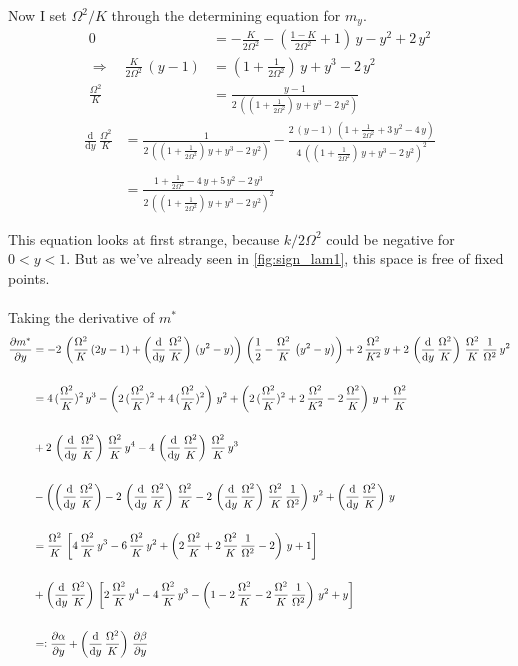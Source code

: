 \documentclass{article}
\begin{document}
\begin{appendices}
Now I set $\Omega^2/K$ through the determining equation for $m_y$.
\begin{align*}
    0&=-\frac{K}{2\Omega^2}-\left( \frac{1-K}{2\Omega^2} +1\right)\,{y}-{y}^2+2\,{y}^2\\
    \Rightarrow\quad \frac{K}{2\Omega^2}\,({y}-1)&=(1+\frac{1}{2\Omega^2})\,{y}+{y}^3-2\,{y}^2\\
    \frac{\Omega^2}{K}&=\frac{{y}-1}{2\,\left(  (1+\frac{1}{2\Omega^2})\,{y}+{y}^3-2\,{y}^2\right)}
\end{align*}
\begin{align*}
    \frac{\text{d}}{\text{d}{y}}\,\frac{\Omega^2}{K}&=\frac{1}{2\,\left(  (1+\frac{1}{2\Omega^2})\,{y}+{y}^3-2\,{y}^2\right)}-\frac{2\,({y}-1)\,(1+\frac{1}{2\Omega^2}+3\,{y}^2-4\,{y})}{4\,\left(  (1+\frac{1}{2\Omega^2})\,{y}+{y}^3-2\,{y}^2\right)^2}\\\\
    &=\frac{1+\frac{1}{2\Omega^2}-4\,{y}+5\,{y}^2-2\,{y}^3}{2\,\left(  (1+\frac{1}{2\Omega^2})\,{y}+{y}^3-2\,{y}^2\right)^2}
\end{align*}

This equation looks at first strange, because $k/2\Omega^2$ could be negative for $0<{y}<1$. But as we've already seen in \autoref{fig:sign_lam1}, this space is free of fixed points. \\\\
Taking the derivative of $m^*$
\begin{align*}
    \frac{\partial m^*}{\partial{y}}&=-2\,\left(\frac{\Omega^2}{K}\,(2{y}-1)+\left(\frac{\text{d}}{\text{d}{y}}\,\frac{\Omega^2}{K}\right)\,({y}^2-{y})\right)\,\left( \frac{1}{2}-\frac{\Omega^2}{K}\,\left( {y}^2- {y} \right) \right)+2\,\frac{\Omega^2}{K^2}\,{y}+2\,\left(\frac{\text{d}}{\text{d}{y}}\,\frac{\Omega^2}{K}\right)\,\frac{\Omega^2}{K}\,\frac{1}{\Omega^2}\,{y}^2\\\\
    &=4\,(\frac{\Omega^2}{K})^2\,{y}^3-\left(2\,(\frac{\Omega^2}{K})^2+4\,(\frac{\Omega^2}{K})^2\right)\,{y}^2+\left( 2\,(\frac{\Omega^2}{K})^2+2\,\frac{\Omega^2}{K^2}-2\,\frac{\Omega^2}{K} \right)\,{y}+\frac{\Omega^2}{K}\\\\
    &+2\,\left(\frac{\text{d}}{\text{d}{y}}\,\frac{\Omega^2}{K}\right)\,\frac{\Omega^2}{K}\,{y}^4-4\,\left(\frac{\text{d}}{\text{d}{y}}\,\frac{\Omega^2}{K}\right)\,\frac{\Omega^2}{K}\,{y}^3\\\\
    &-\left(\left(\frac{\text{d}}{\text{d}{y}}\,\frac{\Omega^2}{K}\right)-2\,\left(\frac{\text{d}}{\text{d}{y}}\,\frac{\Omega^2}{K}\right)\,\frac{\Omega^2}{K}-2\,\left(\frac{\text{d}}{\text{d}{y}}\,\frac{\Omega^2}{K}\right)\,\frac{\Omega^2}{K}\,\frac{1}{\Omega^2}\right)\,{y}^2+\left(\frac{\text{d}}{\text{d}{y}}\,\frac{\Omega^2}{K}\right)\,{y}\\\\
    &=\frac{\Omega^2}{K}\,\left[  4\,\frac{\Omega^2}{K}\,{y}^3-6\,\frac{\Omega^2}{K}\,{y}^2+\left( 2\,\frac{\Omega^2}{K}+2\,\frac{\Omega^2}{K}\,\frac{1}{\Omega^2}-2 \right)\,{y}+1 \right]\\\\
    &+\left(\frac{\text{d}}{\text{d}{y}}\,\frac{\Omega^2}{K}\right)\,\left[2\,\frac{\Omega^2}{K}\,{y}^4-4\,\frac{\Omega^2}{K}\,{y}^3-\left(1-2\,\frac{\Omega^2}{K}-2\,\frac{\Omega^2}{K}\,\frac{1}{\Omega^2}\right)\,{y}^2+{y}\right]\\\\
    &=\vcentcolon \frac{\partial \alpha}{\partial{y}}+\left(\frac{\text{d}}{\text{d}{y}}\,\frac{\Omega^2}{K}\right)\,\frac{\partial \beta}{\partial{y}}
\end{align*}


\end{appendices}
\end{document}
